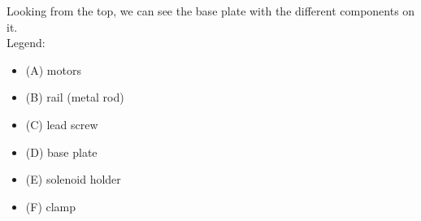 \begin{minipage}[t]{0.30\textwidth}
    \centering{}
\end{minipage}\hfill
\begin{minipage}[t]{0.65\textwidth}
    Looking from the top, we can see the base plate with the different components on it.\\

    Legend:
    \begin{itemize}
        \item (A) motors
        \item (B) rail (metal rod)
        \item (C) lead screw
        \item (D) base plate
        \item (E) solenoid holder
        \item (F) clamp
    \end{itemize}
\end{minipage}


